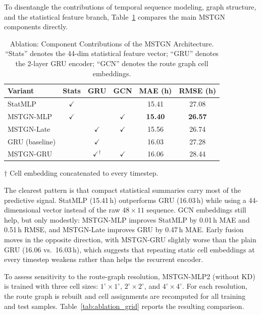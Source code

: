 \documentclass[sigconf,anonymous]{acmart}%
\begin{document}
To disentangle the contributions of temporal sequence modeling, graph structure, and the statistical feature branch, Table~\ref{tab:ablation_graph} compares the main MSTGN components directly.

\begin{table}[t]
    \centering
    \caption{Ablation: Component Contributions of the MSTGN Architecture. ``Stats'' denotes the 44-dim statistical feature vector; ``GRU'' denotes the 2-layer GRU encoder; ``GCN'' denotes the route graph cell embeddings.}
    \label{tab:ablation_graph}
    \begin{tabular}{lccccc}
        \toprule
        \textbf{Variant} & \textbf{Stats} & \textbf{GRU} & \textbf{GCN} & \textbf{MAE (h)} & \textbf{RMSE (h)} \\
        \midrule
        StatMLP          & $\checkmark$   &              &              & 15.41 & 27.08 \\
        MSTGN-MLP        & $\checkmark$   &              & $\checkmark$ & \textbf{15.40} & \textbf{26.57} \\
        MSTGN-Late       &                & $\checkmark$ & $\checkmark$ & 15.56 & 26.74 \\
        GRU (baseline)   &                & $\checkmark$ &              & 16.03 & 27.28 \\
        MSTGN-GRU        &                & $\checkmark^\dagger$ & $\checkmark$ & 16.06 & 28.44 \\
        \bottomrule
    \end{tabular}
    \vspace{2pt}
    {\footnotesize $\dagger$ Cell embedding concatenated to every timestep.}
\end{table}

The clearest pattern is that compact statistical summaries carry most of the predictive signal. StatMLP (15.41\,h) outperforms GRU (16.03\,h) while using a 44-dimensional vector instead of the raw $48{\times}11$ sequence. GCN embeddings still help, but only modestly: MSTGN-MLP improves StatMLP by 0.01\,h MAE and 0.51\,h RMSE, and MSTGN-Late improves GRU by 0.47\,h MAE. Early fusion moves in the opposite direction, with MSTGN-GRU slightly worse than the plain GRU (16.06 vs.\ 16.03\,h), which suggests that repeating static cell embeddings at every timestep weakens rather than helps the recurrent encoder.

To assess sensitivity to the route-graph resolution, MSTGN-MLP2 (without KD) is trained with three cell sizes: $1^\circ{\times}1^\circ$, $2^\circ{\times}2^\circ$, and $4^\circ{\times}4^\circ$. For each resolution, the route graph is rebuilt and cell assignments are recomputed for all training and test samples. Table~\ref{tab:ablation_grid} reports the resulting comparison.
\end{document}
